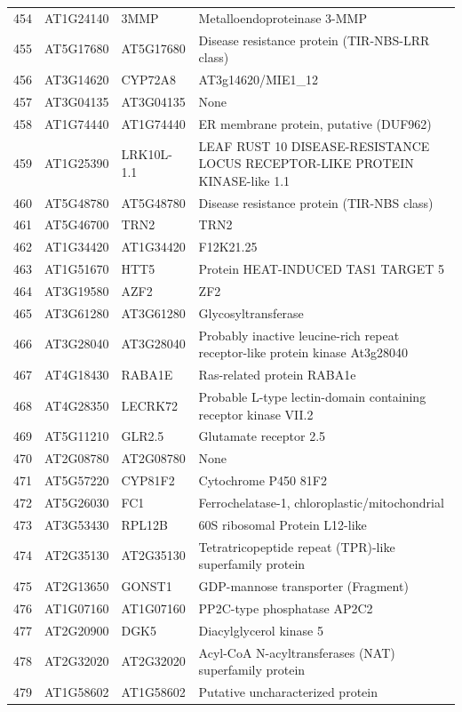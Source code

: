 \documentclass[11pt]{article}
\begin{document}
\begin{center}
\begin{tabular}{rlll}
454 & AT1G24140 & 3MMP & Metalloendoproteinase 3-MMP\\
455 & AT5G17680 & AT5G17680 & Disease resistance protein (TIR-NBS-LRR class)\\
456 & AT3G14620 & CYP72A8 & AT3g14620/MIE1\_12\\
457 & AT3G04135 & AT3G04135 & None\\
458 & AT1G74440 & AT1G74440 & ER membrane protein, putative (DUF962)\\
459 & AT1G25390 & LRK10L-1.1 & LEAF RUST 10 DISEASE-RESISTANCE LOCUS RECEPTOR-LIKE PROTEIN KINASE-like 1.1\\
460 & AT5G48780 & AT5G48780 & Disease resistance protein (TIR-NBS class)\\
461 & AT5G46700 & TRN2 & TRN2\\
462 & AT1G34420 & AT1G34420 & F12K21.25\\
463 & AT1G51670 & HTT5 & Protein HEAT-INDUCED TAS1 TARGET 5\\
464 & AT3G19580 & AZF2 & ZF2\\
465 & AT3G61280 & AT3G61280 & Glycosyltransferase\\
466 & AT3G28040 & AT3G28040 & Probably inactive leucine-rich repeat receptor-like protein kinase At3g28040\\
467 & AT4G18430 & RABA1E & Ras-related protein RABA1e\\
468 & AT4G28350 & LECRK72 & Probable L-type lectin-domain containing receptor kinase VII.2\\
469 & AT5G11210 & GLR2.5 & Glutamate receptor 2.5\\
470 & AT2G08780 & AT2G08780 & None\\
471 & AT5G57220 & CYP81F2 & Cytochrome P450 81F2\\
472 & AT5G26030 & FC1 & Ferrochelatase-1, chloroplastic/mitochondrial\\
473 & AT3G53430 & RPL12B & 60S ribosomal Protein L12-like\\
474 & AT2G35130 & AT2G35130 & Tetratricopeptide repeat (TPR)-like superfamily protein\\
475 & AT2G13650 & GONST1 & GDP-mannose transporter (Fragment)\\
476 & AT1G07160 & AT1G07160 & PP2C-type phosphatase AP2C2\\
477 & AT2G20900 & DGK5 & Diacylglycerol kinase 5\\
478 & AT2G32020 & AT2G32020 & Acyl-CoA N-acyltransferases (NAT) superfamily protein\\
479 & AT1G58602 & AT1G58602 & Putative uncharacterized protein\\

\end{tabular}
\end{center}
\end{document}
